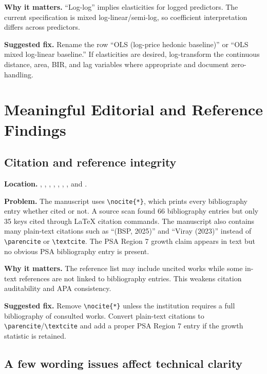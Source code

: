 \documentclass[11pt]{article}
\begin{document}
\textbf{Why it matters.} ``Log-log'' implies elasticities for logged predictors. The current specification is mixed log-linear/semi-log, so coefficient interpretation differs across predictors.

\textbf{Suggested fix.} Rename the row ``OLS (log-price hedonic baseline)'' or ``OLS mixed log-linear baseline.'' If elasticities are desired, log-transform the continuous distance, area, BIR, and lag variables where appropriate and document zero-handling.

\section*{Meaningful Editorial and Reference Findings}

\subsection*{Citation and reference integrity}

\textbf{Location.} , , , , , , , and .

\textbf{Problem.} The manuscript uses \verb|\nocite{*}|, which prints every bibliography entry whether cited or not. A source scan found 66 bibliography entries but only 35 keys cited through LaTeX citation commands. The manuscript also contains many plain-text citations such as ``(BSP, 2025)'' and ``Viray (2023)'' instead of \verb|\parencite| or \verb|\textcite|. The PSA Region 7 growth claim appears in text but no obvious PSA bibliography entry is present.

\textbf{Why it matters.} The reference list may include uncited works while some in-text references are not linked to bibliography entries. This weakens citation auditability and APA consistency.

\textbf{Suggested fix.} Remove \verb|\nocite{*}| unless the institution requires a full bibliography of consulted works. Convert plain-text citations to \verb|\parencite|/\verb|\textcite| and add a proper PSA Region 7 entry if the growth statistic is retained.

\subsection*{A few wording issues affect technical clarity}
\end{document}
